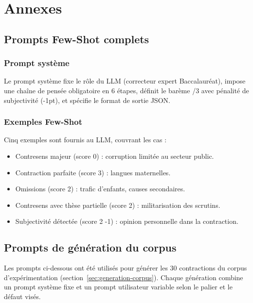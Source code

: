 \chapter{Annexes}
\label{ch:annexes}

\section{Prompts Few-Shot complets}

\subsection{Prompt système}

Le prompt système fixe le rôle du LLM (correcteur expert Baccalauréat), impose une chaîne de pensée obligatoire en 6 étapes, définit le barème /3 avec pénalité de subjectivité (-1pt), et spécifie le format de sortie JSON.



\subsection{Exemples Few-Shot}

Cinq exemples sont fournis au LLM, couvrant les cas :
\begin{itemize}
    \item Contresens majeur (score 0) : corruption limitée au secteur public.
    \item Contraction parfaite (score 3) : langues maternelles.
    \item Omissions (score 2) : trafic d'enfants, causes secondaires.
    \item Contresens avec thèse partielle (score 2) : militarisation des scrutins.
    \item Subjectivité détectée (score 2 -1) : opinion personnelle dans la contraction.
\end{itemize}

\section{Prompts de génération du corpus}
\label{sec:prompts-generation}

Les prompts ci-dessous ont été utilisés pour générer les 30 contractions du corpus d'expérimentation (section~\ref{sec:generation-corpus}). Chaque génération combine un prompt système fixe et un prompt utilisateur variable selon le palier et le défaut visés.

